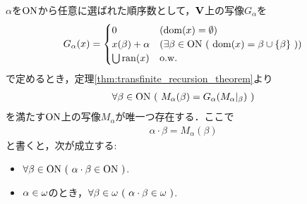 	\begin{screen}
		\begin{thm}[順序数の乗法]
		\label{thm:the_definition_of_multiplication_of_ordinal_numbers}
			$\alpha$を$\mathrm{ON}$から任意に選ばれた順序数として，$\mathbf{V}$上の写像$G_\alpha$を
			\begin{align}
				G_\alpha(x) = 
				\begin{cases}
					0 & (\operatorname{dom}(x) = \emptyset) \\
					x(\beta) + \alpha & (
					\exists \beta \in \mathrm{ON}\ (\ \operatorname{dom}(x) = \beta \cup \{\beta\}\ )) \\
					\bigcup \operatorname{ran}(x) & \mathrm{o.w.}
				\end{cases}
			\end{align}
			で定めるとき，定理\ref{thm:transfinite_recursion_theorem}より
			\begin{align}
				\forall \beta \in \mathrm{ON}\ (\ M_\alpha(\beta) = G_\alpha(M_\alpha|_\beta)\ )
			\end{align}
			を満たす$\mathrm{ON}$上の写像$M_\alpha$が唯一つ存在する．ここで
			\begin{align}
				\alpha \cdot \beta = M_\alpha (\beta)
			\end{align}
			と書くと，次が成立する:
			\begin{itemize}
				\item $\forall \beta \in \mathrm{ON}\ (\ \alpha \cdot \beta \in \mathrm{ON}\ )$.
				\item $\alpha \in {\bf \omega}$のとき，$\forall \beta \in {\bf \omega}\ 
				(\ \alpha \cdot \beta \in {\bf \omega}\ )$.
			\end{itemize}
		\end{thm}
	\end{screen}